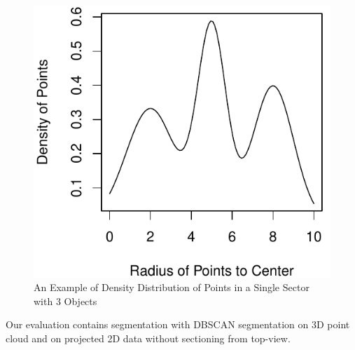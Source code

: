\begin{figure}[!h]
\begin{center}
  \includegraphics[scale=0.6]{./images/sectors_density.pdf}
  \caption{An Example of Density Distribution of Points in a Single Sector with 3 Objects}
  \label{fig:SectorDensity}
\end{center}
\end{figure}
Our evaluation contains segmentation with DBSCAN segmentation on 3D point cloud and on projected 2D
data without sectioning from top-view.
